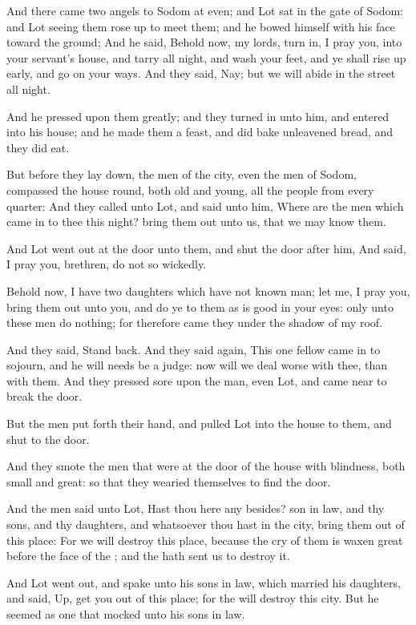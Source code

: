 \verse And there came two angels to Sodom at even; and Lot sat in the gate of Sodom: and Lot seeing them rose up to meet them; and he bowed himself with his face toward the ground; \verse And he said, Behold now, my lords, turn in, I pray you, into your servant's house, and tarry all night, and wash your feet, and ye shall rise up early, and go on your ways. And they said, Nay; but we will abide in the street all night.

\verse And he pressed upon them greatly; and they turned in unto him, and entered into his house; and he made them a feast, and did bake unleavened bread, and they did eat.

\verse But before they lay down, the men of the city, even the men of Sodom, compassed the house round, both old and young, all the people from every quarter: \verse And they called unto Lot, and said unto him, Where are the men which came in to thee this night? bring them out unto us, that we may know them.

\verse And Lot went out at the door unto them, and shut the door after him, \verse And said, I pray you, brethren, do not so wickedly.

\verse Behold now, I have two daughters which have not known man; let me, I pray you, bring them out unto you, and do ye to them as is good in your eyes: only unto these men do nothing; for therefore came they under the shadow of my roof.

\verse And they said, Stand back. And they said again, This one fellow came in to sojourn, and he will needs be a judge: now will we deal worse with thee, than with them. And they pressed sore upon the man, even Lot, and came near to break the door.

\verse But the men put forth their hand, and pulled Lot into the house to them, and shut to the door.

\verse And they smote the men that were at the door of the house with blindness, both small and great: so that they wearied themselves to find the door.

\verse And the men said unto Lot, Hast thou here any besides? son in law, and thy sons, and thy daughters, and whatsoever thou hast in the city, bring them out of this place: \verse For we will destroy this place, because the cry of them is waxen great before the face of the \LORD; and the \LORD hath sent us to destroy it.

\verse And Lot went out, and spake unto his sons in law, which married his daughters, and said, Up, get you out of this place; for the \LORD will destroy this city. But he seemed as one that mocked unto his sons in law.

